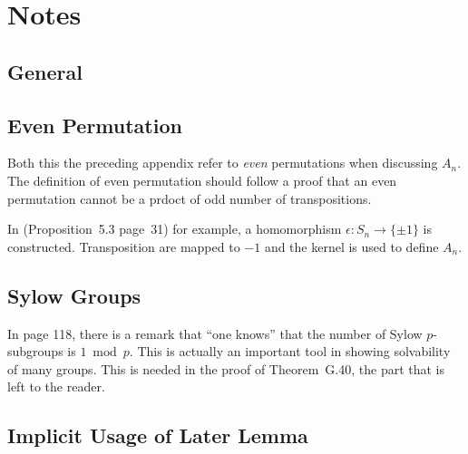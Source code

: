 
\section{Notes}

\subsection*{General}

\subsection{Even Permutation}

Both this the preceding appendix refer to \emph{even} permutations
when discussing \(A_n\). The definition of even permutation
should follow a proof that an even permutation cannot be a prdoct
of odd number of transpositions.

In \cite{Lang94} (Proposition~5.3 page~31) for example,
a homomorphism \(\epsilon: S_n \rightarrow \{\pm1\}\) is constructed.
Transposition are mapped to \(-1\) and
the kernel is used to define \(A_n\).

\subsection*{Sylow Groups}

In page 118, there is a remark that ``one knows''
that the number of Sylow $p$-subgroups is \(1 \bmod p\).
This is actually an important tool in showing solvability
of many groups. This is needed in the proof of Theorem~G.40,
the part that is left to the reader.



\subsection*{Implicit Usage of Later Lemma}

